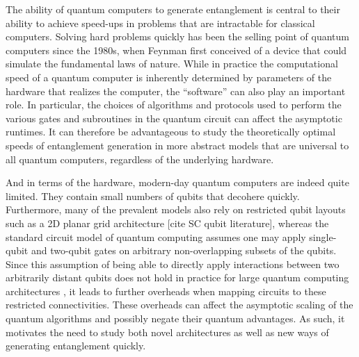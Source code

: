 The ability of quantum computers to generate entanglement is central to their ability to achieve speed-ups in problems that are intractable for classical computers.
Solving hard problems quickly has been the selling point of quantum computers since the 1980s, when Feynman first conceived of a device that could simulate the fundamental laws of nature. %
While in practice the computational speed of a quantum computer is inherently determined by parameters of the hardware that realizes the computer, the ``software'' can also play an important role.
In particular, the choices of algorithms and protocols used to perform the various gates and subroutines in the quantum circuit can affect the asymptotic runtimes.
It can therefore be advantageous to study the theoretically optimal speeds of entanglement generation in more abstract models that are universal to all quantum computers, regardless of the underlying hardware.

And in terms of the hardware, modern-day quantum computers are indeed quite limited. They contain small numbers of qubits that decohere quickly. Furthermore, many of the prevalent models also rely on restricted qubit layouts such as a 2D planar grid architecture [cite SC qubit literature], whereas the standard circuit model of quantum computing assumes one may apply single-qubit and two-qubit gates on arbitrary non-overlapping subsets of the qubits.
Since this assumption of being able to directly apply interactions between two arbitrarily distant qubits does not hold in practice for large quantum computing architectures \cite{Monroe2014,Linke2017,Bapat2018,Childs2019c,Schoute2022}, it leads to further overheads when mapping circuits to these restricted connectivities.
These overheads can affect the asymptotic scaling of the quantum algorithms and possibly negate their quantum advantages.
As such, it motivates the need to study both novel architectures as well as new ways of generating entanglement quickly.

